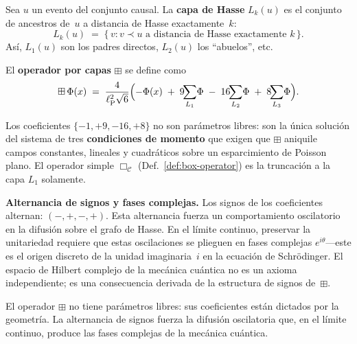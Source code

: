 \documentclass[11pt, a4paper, openany]{book}
\newcommand{\lP}{\ell_{\mathrm{P}}}
\newcommand{\boxlayer}{\boxplus}  %
\begin{document}
\begin{definition}
Sea $u$ un evento del conjunto causal.  La \textbf{capa de Hasse}
$L_k(u)$ es el conjunto de ancestros de~$u$ a distancia de Hasse
exactamente~$k$:
\[
  L_k(u) \;=\; \bigl\{\,v : v \prec u
  \text{ a distancia de Hasse exactamente } k\,\bigr\}.
\]
As\'i, $L_1(u)$ son los padres directos, $L_2(u)$ los ``abuelos'', etc.
\end{definition}

\begin{definition}
\label{def:box-layered}
El \textbf{operador por capas} $\boxlayer$ se define como
\begin{equation}
  \boxlayer\,\Phi(x)
  \;=\;
  \frac{4}{\lP^2\sqrt{6}}
  \Bigl(
    -\Phi(x)
    \;+\; 9\!\!\sum_{L_1}\!\Phi
    \;-\; 16\!\!\sum_{L_2}\!\Phi
    \;+\; 8\!\!\sum_{L_3}\!\Phi
  \Bigr).
  \label{eq:box-layered}
\end{equation}
\end{definition}

\noindent
Los coeficientes $\{-1, +9, -16, +8\}$ no son par\'ametros libres: son
la \'unica soluci\'on del sistema de tres \textbf{condiciones de
momento} que exigen que $\boxlayer$ aniquile campos constantes, lineales
y cuadr\'aticos sobre un esparcimiento de Poisson plano.  El operador
simple $\Box_{\mathcal{C}}$ (Def.~\ref{def:box-operator}) es la
truncaci\'on a la capa $L_1$ solamente.

\medskip\noindent\textbf{Alternancia de signos y fases complejas.}\quad
Los signos de los coeficientes alternan: $(-,+,-,+)$.  Esta alternancia
fuerza un comportamiento oscilatorio en la difusi\'on sobre el grafo de
Hasse.  En el l\'imite continuo, preservar la unitariedad requiere que
estas oscilaciones se plieguen en fases complejas $e^{i\theta}$---este
es el origen discreto de la unidad imaginaria~$i$ en la ecuaci\'on de
Schr\"odinger.  El espacio de Hilbert complejo de la mec\'anica
cu\'antica no es un axioma independiente; es una consecuencia derivada
de la estructura de signos de~$\boxlayer$.

\begin{result}[title={El Operador por Capas}]
El operador $\boxlayer$ no tiene par\'ametros libres: sus coeficientes
est\'an dictados por la geometr\'ia.  La alternancia de signos fuerza la
difusi\'on oscilatoria que, en el l\'imite continuo, produce las fases
complejas de la mec\'anica cu\'antica.
\end{result}
\end{document}
